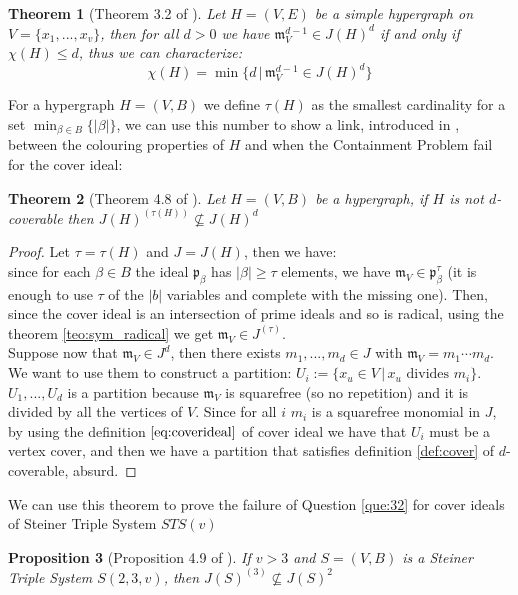 \documentclass[a4wide]{book}
\theoremstyle{plain}
\newtheorem{teo}{Theorem}[section]
\newtheorem{prop}[teo]{Proposition}
\theoremstyle{remark}
\theoremstyle{definition}
\newcommand{\p}{\mathfrak{p}}
\newcommand{\mm}{\mathfrak{m}}
\newcounter{que}
\begin{document}
\begin{teo}[Theorem 3.2 of \cite{Fran10Colourings}] \label{teo:col:chi}
Let $ H = (V,E) $ be a simple hypergraph on $ V = \{ x_1 , ... , x_v\} $, then for all $ d >0 $ we have $ \mm_V^{d-1} \in J(H)^d $ if and only if $ \chi(H) \leq d $, thus we can characterize:
\begin{equation}\label{eq:col:chi}
 \chi(H)   = \min \{ d \,|\, \mm_V^{d-1} \in J(H)^d\}
 \end{equation}
\end{teo}



For a hypergraph $ H = (V,B) $ we define $ \tau (H) $ as the smallest cardinality for a set $ \min_{\beta \in B} \{ |\beta |\}$, we can use this number to show a link, introduced in \cite{Bal21Steiner}, between the colouring properties of $ H $ and when the Containment Problem fail for the cover ideal:

\begin{teo}[Theorem 4.8 of \cite{Bal21Steiner}] \label{teo:col:cont}
Let $ H = (V,B) $ be a hypergraph, if $ H $ is not $ d $-coverable then $ J(H)^{(\tau(H))} \not \subseteq J(H)^d $
\end{teo}

\begin{proof}
Let $\tau = \tau (H)$ and $ J = J(H) $, then we have:\\
since for each $ \beta \in B $ the ideal $ \p_\beta $ has $ |\beta | \geq \tau $ elements, we have $ \mm_V \in \p_\beta^\tau $ (it is enough to use $\tau$ of the $ |b| $ variables and complete with the missing one). Then, since the cover ideal is an intersection of prime ideals and so is radical, using the theorem \ref{teo:sym_radical} we get $ \mm_V \in J^{(\tau)} $.\\
Suppose now that $ \mm_V \in J^d $, then there exists $ m_1 , ... , m_d \in J $ with $ \mm_V = m_1 \cdots m_d $. We want to use them to construct a partition: $ U_i := \{ x_u \in V \,|\, x_u \text{ divides } m_i\} $. $ U_1 , ... ,U_d $ is a partition because $ \mm_V $ is squarefree (so no repetition) and it is divided by all the vertices of $ V $. Since for all $ i $  $ m_i $ is a squarefree monomial in $ J $, by using the definition $ \ref{eq:coverideal} $ of cover ideal we have that $ U_i $ must be a vertex cover, and then we have a partition that satisfies definition \ref{def:cover} of $ d $-coverable, absurd. 
\end{proof}

We can use this theorem to prove the failure of Question \ref{que:32} for cover ideals of Steiner Triple System $ STS(v) $
\begin{prop}[Proposition 4.9 of \cite{Bal21Steiner}]
If $ v>3 $ and $ S = (V,B) $ is a Steiner Triple System $ S(2,3,v) $, then $ J(S)^{(3)}  \not \subseteq J(S)^2$
\end{prop}
\end{document}
